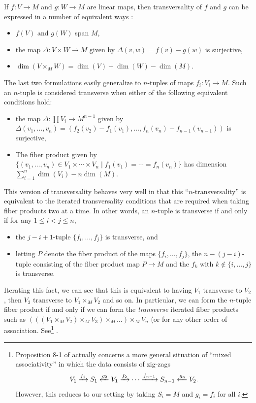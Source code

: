 \begin{remark}
	If $f \colon V\to M$ and $g \colon W\to M$ are linear maps, then transversality of $f$ and $g$ can be expressed in a number of equivalent ways \cite[Section 4.7]{RamBas09}:
	\begin{itemize}
		\item $f(V)$ and $g(W)$ span $M$,
		\item the map $\Delta \colon V\times W\to M$ given by $\Delta(v,w)=f(v)-g(w)$ is surjective,
		\item $\dim(V\times_MW)=\dim(V)+\dim(W)-\dim(M)$.
	\end{itemize}
	The last two formulations easily generalize to $n$-tuples of maps $f_i \colon V_i\to M$.
	Such an $n$-tuple is considered transverse when either of the following equivalent conditions hold:
	\begin{itemize}
		\item the map $\Delta \colon \prod V_i\to M^{n-1}$ given by $\Delta(v_1,\ldots,v_n)=(f_2(v_2)-f_1(v_1),\ldots, f_n(v_n)-f_{n-1}(v_{n-1}))$ is surjective,
		\item The fiber product given by $\{(v_1,\ldots,v_n)\in V_1\times\cdots \times V_n\mid f_1(v_1)=\cdots=f_n(v_n)\}$ has dimension $\sum_{i=1}^n\dim(V_i) -n\dim(M)$.
	\end{itemize}
	This version of transversality behaves very well in that this ``$n$-transversality'' is equivalent to the iterated transversality conditions that are required when taking fiber products two at a time.
	In other words, an $n$-tuple is transverse if and only if for any $1\leq i<j\leq n$,
	\begin{itemize}
		\item the $j-i+1$-tuple $\{f_i,\ldots,f_j\}$ is transverse, and
		\item letting $P$ denote the fiber product of the maps $\{f_i,\ldots,f_j\}$, the $n-(j-i)$-tuple consisting of the fiber product map $P\to M$ and the $f_k$ with $k\notin\{i,\ldots,j\}$ is transverse.
	\end{itemize}
	Iterating this fact, we can see that this is equivalent to having $V_1$ transverse to $V_2$, then $V_3$ transverse to $V_1\times_MV_2$ and so on.
	In particular, we can form the $n$-tuple fiber product if and only if we can form the {\it transverse} iterated fiber products such as $(((V_1\times_MV_2)\times_M V_3)\times_M\ldots)\times_M V_n$ (or for any other order of association.
	See\footnote{Proposition 8-1 of \cite{RamBas09} actually concerns a more general situation of ``mixed associativity'' in which the data consists of zig-zags
		$$V_1\xrightarrow{f_1}S_1\xleftarrow{g_2}V_1\xrightarrow{f_2}\cdots\xrightarrow{f_{n-1}}S_{n-1}\xleftarrow{g_n}V_2.$$
		However, this reduces to our setting by taking $S_i=M$ and $g_i=f_i$ for all $i$.} \cite[Proposition 8-1]{RamBas09}.


\end{remark}
